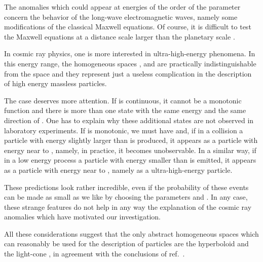 \documentclass[a4paper,12pt]{article}
\begin{document}
The anomalies which could appear at energies of the order of the parameter \coordHE{} concern the behavior of the
long-wave electromagnetic waves, namely some modifications of the classical Maxwell equations. Of course, it is difficult to test the Maxwell equations at a distance scale larger than the planetary scale \cite{Jackson}.

In cosmic ray physics, one is more interested in ultra-high-energy phenomena. In this energy range, the homogeneous spaces \coordHE{}, \coordHE{} and \coordHE{} are practically indistinguishable from the space \coordHE{} and they represent just a useless complication in the description of high energy massless particles. 

The case \coordHE{} deserves more attention. If \coordHE{} is continuous, it cannot be a monotonic function and there is more than one state with the same energy \coordHE{} and the same direction of \coordHE{}. One has to explain why these additional states are not observed in laboratory experiments. If \coordHE{} is monotonic, we must have \coordHE{} and, if in a collision a particle with energy slightly larger than \coordHE{} is produced, it appears as a particle with energy near to \coordHE{}, namely, in practice, it becomes unobservable. In a similar way, if in a low energy process a particle with energy smaller than \coordHE{} is emitted, it appears as a particle with energy near to \coordHE{}, namely as a ultra-high-energy particle. 

These predictions look rather incredible, even if the probability of these events can be made as small as we like by choosing the parameters \coordHE{} and \coordHE{}.  In any case, these strange features do not help in any way the explanation of the cosmic ray anomalies which have motivated our investigation.

All these considerations suggest that the only abstract homogeneous spaces which can reasonably be used for the description of particles are the hyperboloid \coordHE{} and the light-cone \coordHE{}, in agreement with the conclusions of ref.\ \cite{Toller}. 
\end{document}
